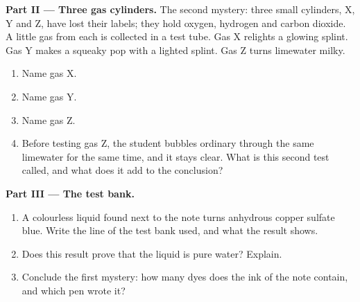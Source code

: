 \begin{problem}
\medskip
\noindent\textbf{Part II --- Three gas cylinders.}
The second mystery: three small cylinders, X, Y and Z, have lost their
labels; they hold oxygen, hydrogen and carbon dioxide. A little gas from
each is collected in a test tube. Gas X relights a glowing splint. Gas Y
makes a squeaky pop with a lighted splint. Gas Z turns limewater milky.
\begin{enumerate}[resume]
  \item Name gas X.
  \item Name gas Y.
  \item Name gas Z.
  \item Before testing gas Z, the student bubbles ordinary  through
        the same limewater for the same time, and it stays clear. What is
        this second test called, and what does it add to the conclusion?
\end{enumerate}

\medskip
\noindent\textbf{Part III --- The test bank.}
\begin{enumerate}[resume]
  \item A colourless liquid found next to the note turns anhydrous
        copper sulfate blue. Write the line of the test bank used, and
        what the result shows.
  \item Does this result prove that the liquid is pure water? Explain.
  \item Conclude the first mystery: how many dyes does the ink of the
        note contain, and which pen wrote it?
\end{enumerate}
\end{problem}
